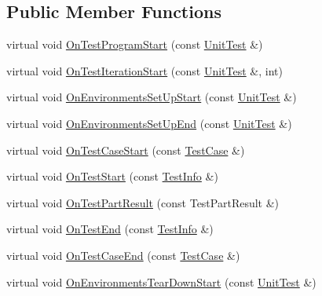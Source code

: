 \subsection*{Public Member Functions}
\begin{DoxyCompactItemize}
\item 
virtual void \mbox{\hyperlink{classtesting_1_1EmptyTestEventListener_aa3847c8a3c22d8d69a6006dfdd6589fc}{On\+Test\+Program\+Start}} (const \mbox{\hyperlink{classtesting_1_1UnitTest}{Unit\+Test}} \&)
\item 
virtual void \mbox{\hyperlink{classtesting_1_1EmptyTestEventListener_a836f05829855dc60d13ba99ad712c0dd}{On\+Test\+Iteration\+Start}} (const \mbox{\hyperlink{classtesting_1_1UnitTest}{Unit\+Test}} \&, int)
\item 
virtual void \mbox{\hyperlink{classtesting_1_1EmptyTestEventListener_a156d1965248fbdced6aabacadfa2d63f}{On\+Environments\+Set\+Up\+Start}} (const \mbox{\hyperlink{classtesting_1_1UnitTest}{Unit\+Test}} \&)
\item 
virtual void \mbox{\hyperlink{classtesting_1_1EmptyTestEventListener_abc481c6648d15d4242245195a06f5aa0}{On\+Environments\+Set\+Up\+End}} (const \mbox{\hyperlink{classtesting_1_1UnitTest}{Unit\+Test}} \&)
\item 
virtual void \mbox{\hyperlink{classtesting_1_1EmptyTestEventListener_ae4707ed9cc7ace5241bc8ccc4051209b}{On\+Test\+Case\+Start}} (const \mbox{\hyperlink{classtesting_1_1TestCase}{Test\+Case}} \&)
\item 
virtual void \mbox{\hyperlink{classtesting_1_1EmptyTestEventListener_a84fa74cc9ba742f9f847ea405ca84e5e}{On\+Test\+Start}} (const \mbox{\hyperlink{classtesting_1_1TestInfo}{Test\+Info}} \&)
\item 
virtual void \mbox{\hyperlink{classtesting_1_1EmptyTestEventListener_a59e7f7d9f2e2d089a6e8c1e2577f4718}{On\+Test\+Part\+Result}} (const Test\+Part\+Result \&)
\item 
virtual void \mbox{\hyperlink{classtesting_1_1EmptyTestEventListener_afd58d21005f0d0d0399fb114627545d3}{On\+Test\+End}} (const \mbox{\hyperlink{classtesting_1_1TestInfo}{Test\+Info}} \&)
\item 
virtual void \mbox{\hyperlink{classtesting_1_1EmptyTestEventListener_a6bec703158283104c4298f7d8a528515}{On\+Test\+Case\+End}} (const \mbox{\hyperlink{classtesting_1_1TestCase}{Test\+Case}} \&)
\item 
virtual void \mbox{\hyperlink{classtesting_1_1EmptyTestEventListener_a00fa1a4ea5831e20746188414268e7c6}{On\+Environments\+Tear\+Down\+Start}} (const \mbox{\hyperlink{classtesting_1_1UnitTest}{Unit\+Test}} \&)

\end{DoxyCompactItemize}
